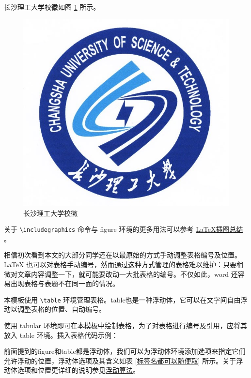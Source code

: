 长沙理工大学校徽如图 \ref{fig.csustlogo} 所示。  %

\begin{figure}[htbp]  %
  \centering  %
  \includegraphics[scale=.5]{figure/template/csustlogo_626by572.jpg}  %
  \caption{长沙理工大学校徽}  %
  \label{fig.csustlogo}  %
\end{figure}

关于 \verb!\includegraphics! 命令与 figure 环境的更多用法可以参考 \href{https://zhuanlan.zhihu.com/p/262389031}{\LaTeX{}插图总结} 。


相信初次看到本文的大部分同学还在以最原始的方式手动调整表格编号及位置。 \LaTeX{} 也可以对表格手动编号，然而通过这种方式管理的表格难以维护：只要稍微对文章内容调整一下，就可能要改动一大批表格的编号。不仅如此，word 还容易出现表格与表题不在同一面的情况。

本模板使用 \verb!\table! 环境管理表格。table也是一种浮动体，它可以在文字间自由浮动以调整表格的位置、自动编号。

使用 tabular 环境即可在本模板中绘制表格，为了对表格进行编号及引用，应将其放入 table 环境。插入表格代码示例：

前面提到的figure和table都是浮动体，我们可以为浮动体环境添加选项来指定它们允许浮动的位置，浮动体选项及其含义如表 \ref{标签名都可以随便取} 所示。关于浮动体选项和位置更详细的说明参见\href{https://www.latexstudio.net/archives/10043.html}{浮动算法}。


